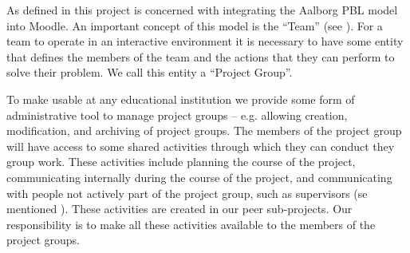 
As defined in  this project is concerned with integrating the Aalborg PBL model into Moodle.
An important concept of this model is the ``Team'' (see ).
For a team to operate in an interactive environment it is necessary to have some entity that defines the members of the team and the actions that they can perform to solve their problem.
We call this entity a ``Project Group''.

To make \system{} usable at any educational institution we provide some form of administrative tool to manage project groups -- e.g. allowing  creation, modification, and archiving of project groups.
The members of the project group will have access to some shared activities through which they can conduct they group work.
These activities include planning the course of the project, communicating internally during the course of the project, and communicating with people not actively part of the project group, such as supervisors (se mentioned ).
These activities are created in our peer sub-projects.
Our responsibility is to make all these activities available to the members of the project groups.
	